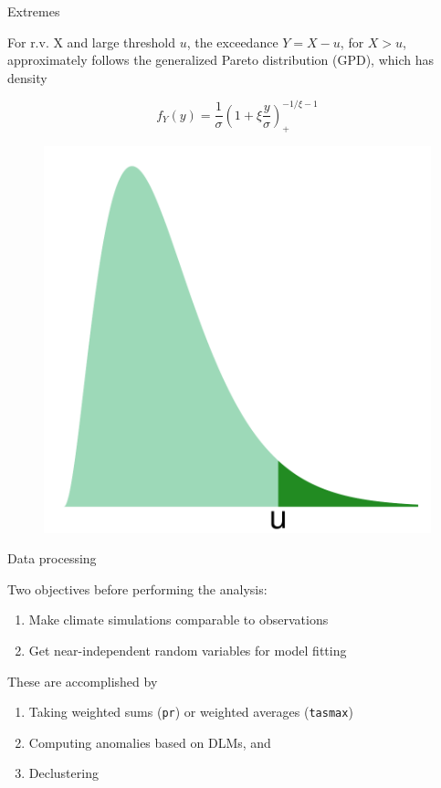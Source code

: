 \documentclass[mathserif, 11pt, t]{beamer}
\begin{document}
\begin{frame}{Extremes}

For r.v. X and large threshold $u$, the exceedance $Y=X-u$, for $X>u$, approximately follows the generalized Pareto distribution (GPD), which has density

\[ f_Y(y) = \frac{1}{\sigma}\left(1+\xi\frac{y}{\sigma}\right)_+^{-1/\xi-1} \]

\begin{figure}
\begin{center}
\includegraphics[scale=0.22]{figs/tail.pdf}
\end{center}
\end{figure}

\end{frame}



\begin{frame}{Data processing}

Two objectives before performing the analysis:
\begin{enumerate}
\item Make climate simulations comparable to observations
\item Get near-independent random variables for model fitting
\end{enumerate}
\bigskip

These are accomplished by
\begin{enumerate}
\item Taking weighted sums (\texttt{pr}) or weighted averages (\texttt{tasmax})
\item Computing anomalies based on DLMs, and
\item Declustering
\end{enumerate}

\end{frame}
\end{document}
